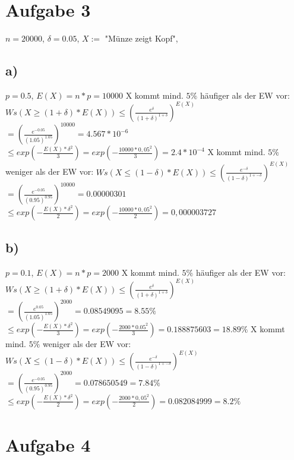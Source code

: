 \documentclass[a4paper,10pt,oneside,leqno]{scrartcl}
\begin{document}
\section*{Aufgabe 3}%
$n=20000$, $\delta = 0.05$, $X :=$ "Münze zeigt Kopf",
\subsection*{a)}
$p = 0.5$, $E(X) = n*p = 10000$\newline
X kommt mind. $5\%$ häufiger als der EW vor:\newline
$Ws(X \geq (1+\delta) * E(X)) \leq (\frac{e^{\delta}}{(1+\delta)^{1+\delta}})^{E(X)}$\newline
$=(\frac{e^{-0.05}}{(1.05)^{1.05}})^{10000} = 4.567*10^{-6}$\newline
$\leq exp(-\frac{E(X)*\delta^2}{3}) = exp(-\frac{10000*0,05^2}{3}) = 2.4*10^{-4}$\newline \newline
X kommt mind. $5\%$ weniger als der EW vor:\newline
$Ws(X \leq (1-\delta) * E(X)) \leq (\frac{e^{-\delta}}{(1-\delta)^{1+-\delta}})^{E(X)}$\newline
$=(\frac{e^{-0.05}}{(0.95)^{0.95}})^{10000} = 0.00000301$\newline
$\leq exp(-\frac{E(X)*\delta^2}{2}) = exp(-\frac{10000*0,05^2}{2}) = 0,000003727$\newline
\subsection*{b)}
$p = 0.1$, $E(X) = n*p = 2000$\newline
X kommt mind. $5\%$ häufiger als der EW vor:\newline
$Ws(X \geq (1+\delta) * E(X)) \leq (\frac{e^{\delta}}{(1+\delta)^{1+\delta}})^{E(X)}$\newline
$=(\frac{e^{0.05}}{(1.05)^{1.05}})^{2000} = 0.08549095 = 8.55\%$\newline
$\leq exp(-\frac{E(X)*\delta^2}{3}) = exp(-\frac{2000*0.05^2}{3}) = 0.188875603 = 18.89\%$\newline \newline
X kommt mind. $5\%$ weniger als der EW vor:\newline
$Ws(X \leq (1-\delta) * E(X)) \leq (\frac{e^{-\delta}}{(1-\delta)^{1+-\delta}})^{E(X)}$\newline
$=(\frac{e^{-0.05}}{(0.95)^{0.95}})^{2000} = 0.078650549 = 7.84\%$\newline
$\leq exp(-\frac{E(X)*\delta^2}{2}) = exp(-\frac{2000*0,05^2}{2}) = 0.082084999 = 8.2\%$\newline

\section*{Aufgabe 4}%
\end{document}
